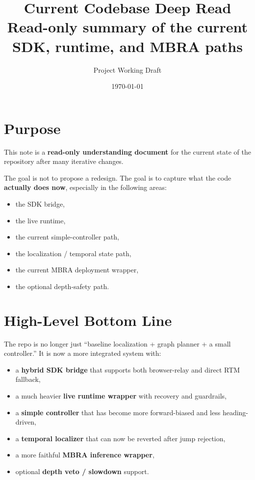 \documentclass[11pt,a4paper]{article}
\title{Current Codebase Deep Read\\[0.3em]
\large Read-only summary of the current SDK, runtime, and MBRA paths}
\author{Project Working Draft}
\date{\today}
\begin{document}
\maketitle

\section{Purpose}

This note is a \textbf{read-only understanding document} for the current state
of the repository after many iterative changes.

The goal is not to propose a redesign. The goal is to capture what the code
\textbf{actually does now}, especially in the following areas:

\begin{itemize}[nosep]
  \item the SDK bridge,
  \item the live runtime,
  \item the current simple-controller path,
  \item the localization / temporal state path,
  \item the current MBRA deployment wrapper,
  \item the optional depth-safety path.
\end{itemize}


\section{High-Level Bottom Line}

\begin{mdframed}
The repo is no longer just ``baseline localization + graph planner + a small
controller.'' It is now a more integrated system with:

\begin{itemize}[nosep]
  \item a \textbf{hybrid SDK bridge} that supports both browser-relay and direct RTM fallback,
  \item a much heavier \textbf{live runtime wrapper} with recovery and guardrails,
  \item a \textbf{simple controller} that has become more forward-biased and less heading-driven,
  \item a \textbf{temporal localizer} that can now be reverted after jump rejection,
  \item a more faithful \textbf{MBRA inference wrapper},
  \item optional \textbf{depth veto / slowdown} support.
\end{itemize}
\end{mdframed}
\end{document}
